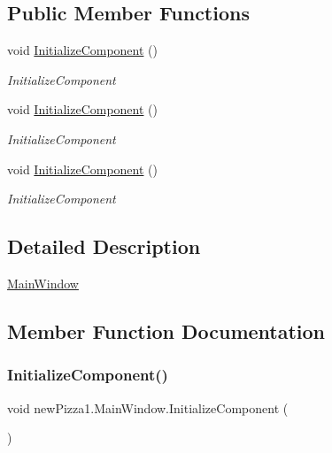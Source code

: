 \subsection*{Public Member Functions}
\begin{DoxyCompactItemize}
\item 
void \hyperlink{classnewPizza1_1_1MainWindow_abfa6d086ad6fa95a25da1f69351890ba}{Initialize\+Component} ()
\begin{DoxyCompactList}\small\item\em Initialize\+Component \end{DoxyCompactList}\item 
void \hyperlink{classnewPizza1_1_1MainWindow_abfa6d086ad6fa95a25da1f69351890ba}{Initialize\+Component} ()
\begin{DoxyCompactList}\small\item\em Initialize\+Component \end{DoxyCompactList}\item 
void \hyperlink{classnewPizza1_1_1MainWindow_abfa6d086ad6fa95a25da1f69351890ba}{Initialize\+Component} ()
\begin{DoxyCompactList}\small\item\em Initialize\+Component \end{DoxyCompactList}\end{DoxyCompactItemize}


\subsection{Detailed Description}
\hyperlink{classnewPizza1_1_1MainWindow}{Main\+Window} 



\subsection{Member Function Documentation}
\mbox{\label{classnewPizza1_1_1MainWindow_abfa6d086ad6fa95a25da1f69351890ba}} 
\subsubsection{\texorpdfstring{Initialize\+Component()}{InitializeComponent()}\hspace{0.1cm}{\footnotesize\ttfamily [1/3]}}
{\footnotesize\ttfamily void new\+Pizza1.\+Main\+Window.\+Initialize\+Component (\begin{DoxyParamCaption}{ }\end{DoxyParamCaption})\hspace{0.3cm}{\ttfamily [inline]}}



